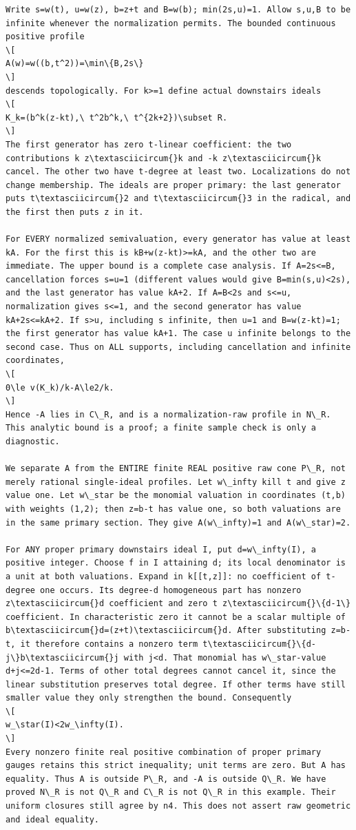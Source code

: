 \documentclass[
  11pt,
]{article}
\begin{document}
\begin{lstlisting}
Write s=w(t), u=w(z), b=z+t and B=w(b); min(2s,u)=1. Allow s,u,B to be infinite whenever the normalization permits. The bounded continuous positive profile
\[
A(w)=w((b,t^2))=\min\{B,2s\}
\]
descends topologically. For k>=1 define actual downstairs ideals
\[
K_k=(b^k(z-kt),\ t^2b^k,\ t^{2k+2})\subset R.
\]
The first generator has zero t-linear coefficient: the two contributions k z\textasciicircum{}k and -k z\textasciicircum{}k cancel. The other two have t-degree at least two. Localizations do not change membership. The ideals are proper primary: the last generator puts t\textasciicircum{}2 and t\textasciicircum{}3 in the radical, and the first then puts z in it.

For EVERY normalized semivaluation, every generator has value at least kA. For the first this is kB+w(z-kt)>=kA, and the other two are immediate. The upper bound is a complete case analysis. If A=2s<=B, cancellation forces s=u=1 (different values would give B=min(s,u)<2s), and the last generator has value kA+2. If A=B<2s and s<=u, normalization gives s<=1, and the second generator has value kA+2s<=kA+2. If s>u, including s infinite, then u=1 and B=w(z-kt)=1; the first generator has value kA+1. The case u infinite belongs to the second case. Thus on ALL supports, including cancellation and infinite coordinates,
\[
0\le v(K_k)/k-A\le2/k.
\]
Hence -A lies in C\_R, and is a normalization-raw profile in N\_R. This analytic bound is a proof; a finite sample check is only a diagnostic.

We separate A from the ENTIRE finite REAL positive raw cone P\_R, not merely rational single-ideal profiles. Let w\_infty kill t and give z value one. Let w\_star be the monomial valuation in coordinates (t,b) with weights (1,2); then z=b-t has value one, so both valuations are in the same primary section. They give A(w\_infty)=1 and A(w\_star)=2.

For ANY proper primary downstairs ideal I, put d=w\_infty(I), a positive integer. Choose f in I attaining d; its local denominator is a unit at both valuations. Expand in k[[t,z]]: no coefficient of t-degree one occurs. Its degree-d homogeneous part has nonzero z\textasciicircum{}d coefficient and zero t z\textasciicircum{}\{d-1\} coefficient. In characteristic zero it cannot be a scalar multiple of b\textasciicircum{}d=(z+t)\textasciicircum{}d. After substituting z=b-t, it therefore contains a nonzero term t\textasciicircum{}\{d-j\}b\textasciicircum{}j with j<d. That monomial has w\_star-value d+j<=2d-1. Terms of other total degrees cannot cancel it, since the linear substitution preserves total degree. If other terms have still smaller value they only strengthen the bound. Consequently
\[
w_\star(I)<2w_\infty(I).
\]
Every nonzero finite real positive combination of proper primary gauges retains this strict inequality; unit terms are zero. But A has equality. Thus A is outside P\_R, and -A is outside Q\_R. We have proved N\_R is not Q\_R and C\_R is not Q\_R in this example. Their uniform closures still agree by n4. This does not assert raw geometric and ideal equality.


\end{lstlisting}
\end{document}

